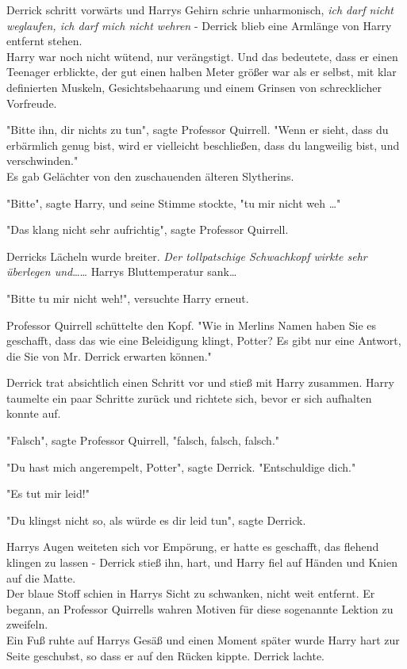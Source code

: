 {Derrick schritt vorwärts und Harrys Gehirn schrie unharmonisch, \emph{ich darf nicht weglaufen, ich darf mich nicht wehren} - Derrick blieb eine Armlänge von Harry entfernt stehen.\\ Harry war noch nicht wütend, nur verängstigt. Und das bedeutete, dass er einen Teenager erblickte, der gut einen halben Meter größer war als er selbst, mit klar definierten Muskeln, Gesichtsbehaarung und einem Grinsen von schrecklicher Vorfreude.

"Bitte ihn, dir nichts zu tun", sagte Professor Quirrell. "Wenn er sieht, dass du erbärmlich genug bist, wird er vielleicht beschließen, dass du langweilig bist, und verschwinden."\\ Es gab Gelächter von den zuschauenden älteren Slytherins.

"Bitte", sagte Harry, und seine Stimme stockte, "tu mir nicht weh …"

"Das klang nicht sehr aufrichtig", sagte Professor Quirrell.

Derricks Lächeln wurde breiter. \emph{Der tollpatschige Schwachkopf wirkte sehr überlegen und}…… Harrys Bluttemperatur sank…

"Bitte tu mir nicht weh!", versuchte Harry erneut.

Professor Quirrell schüttelte den Kopf. "Wie in Merlins Namen haben Sie es geschafft, dass das wie eine Beleidigung klingt, Potter? Es gibt nur eine Antwort, die Sie von Mr. Derrick erwarten können."

Derrick trat absichtlich einen Schritt vor und stieß mit Harry zusammen. Harry taumelte ein paar Schritte zurück und richtete sich, bevor er sich aufhalten konnte auf.

"Falsch", sagte Professor Quirrell, "falsch, falsch, falsch."

"Du hast mich angerempelt, Potter", sagte Derrick. "Entschuldige dich."

"Es tut mir leid!"

"Du klingst nicht so, als würde es dir leid tun", sagte Derrick.

Harrys Augen weiteten sich vor Empörung, er hatte es geschafft, das flehend klingen zu lassen - Derrick stieß ihn, hart, und Harry fiel auf Händen und Knien auf die Matte.\\ Der blaue Stoff schien in Harrys Sicht zu schwanken, nicht weit entfernt. Er begann, an Professor Quirrells wahren Motiven für diese sogenannte Lektion zu zweifeln.\\ Ein Fuß ruhte auf Harrys Gesäß und einen Moment später wurde Harry hart zur Seite geschubst, so dass er auf den Rücken kippte. Derrick lachte.

}
